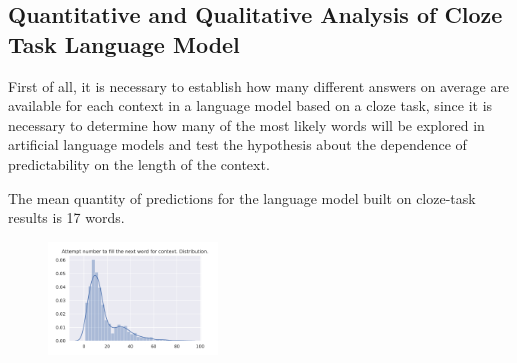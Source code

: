 \documentclass[a4paper]{article}
\begin{document}
\subsection{Quantitative and Qualitative Analysis of Cloze Task Language Model}

First of all, it is necessary to establish how many different answers on average are available for each context in a language model based on a cloze task, since it is necessary to determine how many of the most likely words will be explored in artificial language models and test the hypothesis about the dependence of predictability on the length of the context.

The mean quantity of predictions for the language model built on cloze-task results is 17 words.

\begin{figure}
\centering
\includegraphics[width=0.4\textwidth]{figures/pdf/num-fill-context-dist.pdf}
\end{figure}
\end{document}
